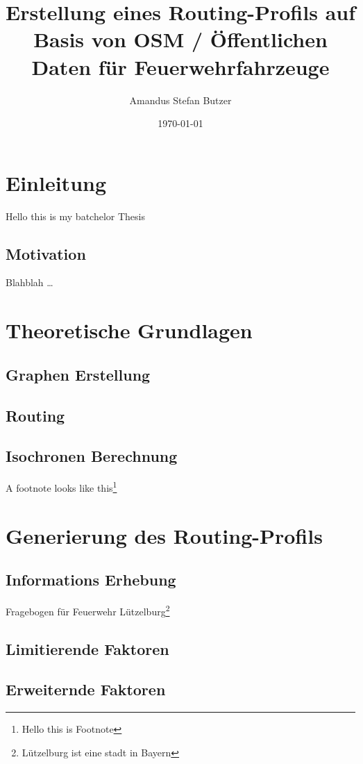 \documentclass[10pt,a4paper]{article}
\author{Amandus Stefan Butzer}
\title{Erstellung eines Routing-Profils auf Basis von OSM / Öffentlichen Daten für Feuerwehrfahrzeuge}
\date{\today}
\begin{document}
\maketitle


\section{Einleitung}

Hello this is my batchelor Thesis

\subsection{Motivation}

Blahblah \ldots

\section{Theoretische Grundlagen}

\subsection{Graphen Erstellung}

\subsection{Routing}

\subsection{Isochronen Berechnung}
A footnote looks like this\footnote{Hello this is Footnote}

\section{Generierung des Routing-Profils}

\subsection{Informations Erhebung}
Fragebogen für Feuerwehr Lützelburg\footnote{Lützelburg ist eine stadt in Bayern}

\subsection{Limitierende Faktoren}

\subsection{Erweiternde Faktoren}
\end{document}
